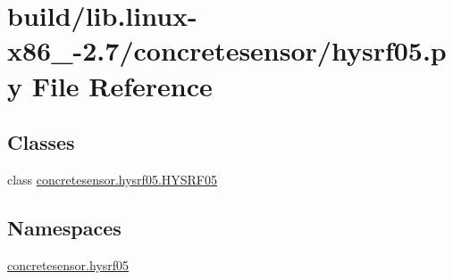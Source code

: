 \hypertarget{build_2lib_8linux-x86__64-2_87_2concretesensor_2hysrf05_8py}{}\section{build/lib.linux-\/x86\+\_-\/2.7/concretesensor/hysrf05.py File Reference}
\label{build_2lib_8linux-x86__64-2_87_2concretesensor_2hysrf05_8py}
\subsection*{Classes}
\begin{DoxyCompactItemize}
\item 
class \hyperlink{classconcretesensor_1_1hysrf05_1_1HYSRF05}{concretesensor.\+hysrf05.\+H\+Y\+S\+R\+F05}
\end{DoxyCompactItemize}
\subsection*{Namespaces}
\begin{DoxyCompactItemize}
\item 
 \hyperlink{namespaceconcretesensor_1_1hysrf05}{concretesensor.\+hysrf05}
\end{DoxyCompactItemize}
